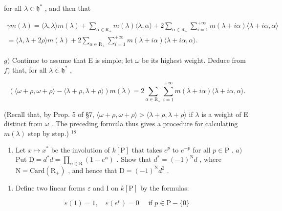for all \(\lambda \in \mathfrak{h}^*\) , and then that

\[
\begin{array}{l} \gamma m (\lambda) = \langle \lambda , \lambda \rangle m (\lambda) + \sum_ {\alpha \in \mathrm{R} _ {+}} m (\lambda) \langle \lambda , \alpha \rangle + 2 \sum_ {\alpha \in \mathrm{R} _ {+}} \sum_ {i = 1} ^ {+ \infty} m (\lambda + i \alpha) \langle \lambda + i \alpha , \alpha \rangle \\ = \langle \lambda , \lambda + 2 \rho \rangle m (\lambda) + 2 \sum_ {\alpha \in \mathrm{R} _ {+}} \sum_ {i = 1} ^ {+ \infty} m (\lambda + i \alpha) \langle \lambda + i \alpha , \alpha \rangle . \end{array}
\]

\(g)\) Continue to assume that E is simple; let \(\omega\) be its highest weight. Deduce from \(f)\) that, for all \(\lambda \in \mathfrak{h}^*\) ,

\[
(\langle \omega + \rho , \omega + \rho \rangle - \langle \lambda + \rho , \lambda + \rho \rangle) m (\lambda) = 2 \sum_ {\alpha \in \mathrm{R} _ {+}} \sum_ {i = 1} ^ {+ \infty} m (\lambda + i \alpha) \langle \lambda + i \alpha , \alpha \rangle .
\]

(Recall that, by Prop. 5 of §7, \(\langle\omega+\rho,\omega+\rho\rangle>\langle\lambda+\rho,\lambda+\rho\rangle\) if \(\lambda\) is a weight of E distinct from \(\omega\) . The preceding formula thus gives a procedure for calculating \(m(\lambda)\) step by step.) \(^{18}\)

\begin{enumerate}
\def\labelenumi{\arabic{enumi})}
\setcounter{enumi}{5}
\tightlist
\item
  Let \(x \mapsto x^*\) be the involution of \(k[\mathrm{P}]\) that takes \(e^p\) to \(e^{-p}\) for all \(p \in \mathrm{P}\) . \(a)\) Put \(\mathrm{D} = d^* d = \prod_{\alpha \in \mathrm{R}} (1 - e^\alpha)\) . Show that \(d^* = (-1)^{\mathrm{N}} d\) , where \(\mathrm{N} = \mathrm{Card}(\mathrm{R}_+)\) , and hence that \(\mathrm{D} = (-1)^{\mathrm{N}} d^2\) .
\end{enumerate}

\begin{enumerate}
\def\labelenumi{\alph{enumi})}
\setcounter{enumi}{1}
\tightlist
\item
  Define two linear forms \(\varepsilon\) and I on \(k[\mathrm{P}]\) by the formulas:
\end{enumerate}

\[
\varepsilon (1) = 1, \quad \varepsilon (e ^ {p}) = 0 \quad \text { if } p \in \mathrm{P} - \{0 \}
\]

